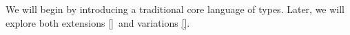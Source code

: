 \secdown

We will begin by introducing a traditional core language of types. Later, we
will explore both extensions \ref{}\ and variations \ref{}.








\secup
